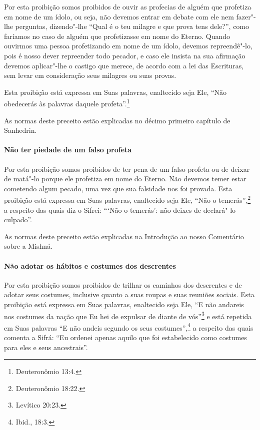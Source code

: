 \begin{multicols}{2}
Por esta proibição somos proibidos de ouvir as profecias de alguém que
profetiza em nome de um ídolo, ou seja, não devemos entrar em debate com
ele nem fazer"-lhe perguntas, dizendo"-lhe ``Qual é o teu milagre e que
prova tens dele?'', como faríamos no caso de alguém que profetizasse em
nome do Eterno. Quando ouvirmos uma pessoa profetizando em nome de um
ídolo, devemos repreendê"-lo, pois é nosso dever repreender todo pecador,
e caso ele insista na sua afirmação devemos aplicar"-lhe o castigo que
merece, de acordo com a lei das Escrituras, sem levar em consideração
seus milagres ou suas provas.

Esta proibição está expressa em Suas palavras, enaltecido seja Ele,
``Não obedecerás às palavras daquele profeta''.\footnote{Deuteronômio 13:4.}

As normas deste preceito estão explicadas no décimo primeiro capítulo
de Sanhedrin\starr.

\paragraph{Não ter piedade de um falso profeta}

Por esta proibição somos proibidos de ter pena de um falso profeta ou de
deixar de matá"-lo porque ele profetiza em nome do Eterno. Não devemos
temer estar cometendo algum pecado, uma vez que sua falsidade nos foi
provada. Esta proibição está expressa em Suas palavras, enaltecido seja
Ele, ``Não o temerás'',\footnote{Deuteronômio 18:22.} a respeito das quais diz o
Sifrei\starr: ```Não o temerás': não deixes de declará"-lo culpado''.

As normas deste preceito estão explicadas na Introdução ao nosso
Comentário sobre a Mishná\starr.

\paragraph{Não adotar os hábitos e costumes dos descrentes}

Por esta proibição somos proibidos de trilhar os caminhos dos descrentes
e de adotar seus costumes, inclusive quanto a suas roupas e suas
reuniões sociais. Esta proibição está expressa em Suas palavras,
enaltecido seja Ele, ``E não andareis nos costumes da nação que Eu hei
de expulsar de diante de vós''\footnote{Levítico 20:23.} e está repetida em Suas
palavras ``E não andeis segundo os seus costumes'',\footnote{Ibid., 18:3.} a
respeito das quais comenta a Sifrá\starr: ``Eu ordenei apenas aquilo que foi
estabelecido como costumes para eles e seus ancestrais''.


\end{multicols}
